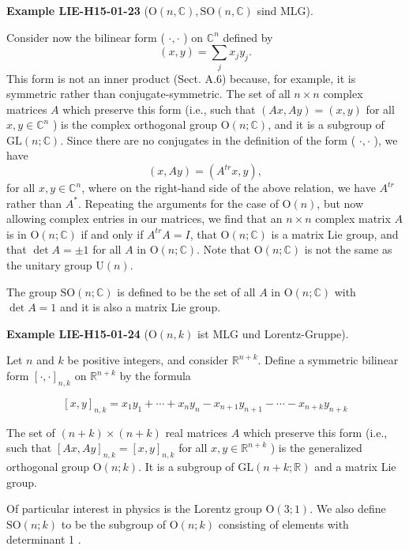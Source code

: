 \documentclass[10pt, letterpaper]{article}
\newcommand{\C}{\mathbb{C}}
\newcommand{\SO}{\mathrm{SO}}
\newcommand{\Ogroup}{\mathrm{O}} %
\newcommand{\CustomHeading}[3]{%
  \par\medskip\noindent%
  \textbf{#1 #2} \textnormal{(#3)}.\enskip%
}
\newenvironment{EXA}[2]{\CustomHeading{Example}{#1}{#2}}{}
\begin{document}
\begin{EXA}{LIE-H15-01-23}{$\Ogroup(n,\C), \SO(n,\C)$ sind MLG}
Consider now the bilinear form ( $\cdot, \cdot$ ) on $\mathbb{C}^{n}$ defined by
$$
(x, y)=\sum_{j} x_{j} y_{j} .
$$
This form is not an inner product (Sect. A.6) because, for example, it is symmetric rather than conjugate-symmetric. The set of all $n \times n$ complex matrices $A$ which preserve this form (i.e., such that $(A x, A y)=(x, y)$ for all $x, y \in \mathbb{C}^{n}$ ) is the complex orthogonal group $\mathrm{O}(n ; \mathbb{C})$, and it is a subgroup of $\mathrm{GL}(n ; \mathbb{C})$. Since there are no conjugates in the definition of the form ( $\cdot, \cdot$ ), we have
$$
(x, A y)=\left(A^{t r} x, y\right),
$$
for all $x, y \in \mathbb{C}^{n}$, where on the right-hand side of the above relation, we have $A^{t r}$ rather than $A^{*}$. Repeating the arguments for the case of $\mathrm{O}(n)$, but now allowing complex entries in our matrices, we find that an $n \times n$ complex matrix $A$ is in $\mathrm{O}(n ; \mathbb{C})$ if and only if $A^{t r} A=I$, that $\mathrm{O}(n ; \mathbb{C})$ is a matrix Lie group, and that $\operatorname{det} A= \pm 1$ for all $A$ in $\mathrm{O}(n ; \mathbb{C})$. Note that $\mathrm{O}(n ; \mathbb{C})$ is not the same as the unitary group $\mathrm{U}(n)$. 

The group $\mathrm{SO}(n ; \mathbb{C})$ is defined to be the set of all $A$ in $\mathrm{O}(n ; \mathbb{C})$ with $\operatorname{det} A=1$ and it is also a matrix Lie group.
\end{EXA}

\begin{EXA}{LIE-H15-01-24}{$\Ogroup(n,k)$ ist MLG und Lorentz-Gruppe}
Let $n$ and $k$ be positive integers, and consider $\mathbb{R}^{n+k}$. Define a symmetric bilinear form $[\cdot, \cdot]_{n, k}$ on $\mathbb{R}^{n+k}$ by the formula

$$
[x, y]_{n, k}=x_{1} y_{1}+\cdots+x_{n} y_{n}-x_{n+1} y_{n+1}-\cdots-x_{n+k} y_{n+k}
$$

The set of $(n+k) \times(n+k)$ real matrices $A$ which preserve this form (i.e., such that $[A x, A y]_{n, k}=[x, y]_{n, k}$ for all $x, y \in \mathbb{R}^{n+k}$ ) is the generalized orthogonal group $\mathrm{O}(n ; k)$. It is a subgroup of $\mathrm{GL}(n+k ; \mathbb{R})$ and a matrix Lie group.


Of particular interest in physics is the Lorentz group $\mathrm{O}(3 ; 1)$. We also define $\mathrm{SO}(n ; k)$ to be the subgroup of $\mathrm{O}(n ; k)$ consisting of elements with determinant 1 .
\end{EXA}
\end{document}
